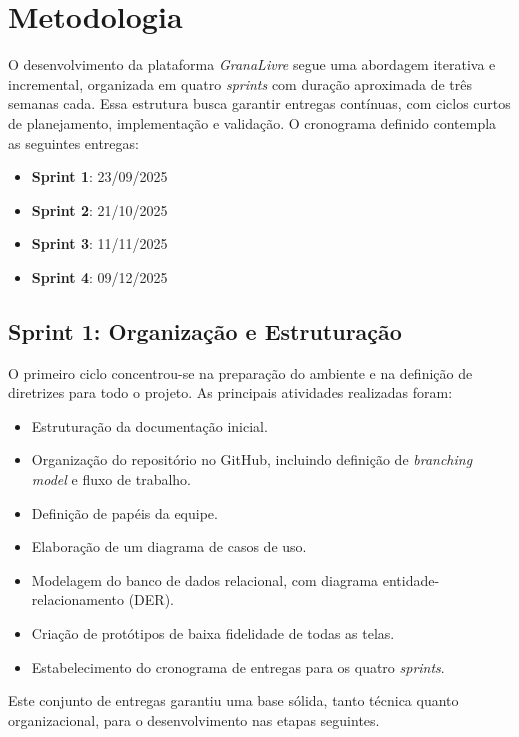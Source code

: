 \chapter{Metodologia}\label{cap:metodologia}

O desenvolvimento da plataforma \textit{GranaLivre} segue uma abordagem iterativa e incremental, organizada em quatro \textit{sprints} com duração aproximada de três semanas cada. Essa estrutura busca garantir entregas contínuas, com ciclos curtos de planejamento, implementação e validação. O cronograma definido contempla as seguintes entregas:

\begin{itemize}
    \item \textbf{Sprint 1}: 23/09/2025
    \item \textbf{Sprint 2}: 21/10/2025
    \item \textbf{Sprint 3}: 11/11/2025
    \item \textbf{Sprint 4}: 09/12/2025
\end{itemize}

\section{Sprint 1: Organização e Estruturação}

O primeiro ciclo concentrou-se na preparação do ambiente e na definição de diretrizes para todo o projeto. As principais atividades realizadas foram:

\begin{itemize}
    \item Estruturação da documentação inicial.
    \item Organização do repositório no GitHub, incluindo definição de \textit{branching model} e fluxo de trabalho.
    \item Definição de papéis da equipe.
    \item Elaboração de um diagrama de casos de uso.
    \item Modelagem do banco de dados relacional, com diagrama entidade-relacionamento (DER).
    \item Criação de protótipos de baixa fidelidade de todas as telas.
    \item Estabelecimento do cronograma de entregas para os quatro \textit{sprints}.
\end{itemize}

Este conjunto de entregas garantiu uma base sólida, tanto técnica quanto organizacional, para o desenvolvimento nas etapas seguintes.


